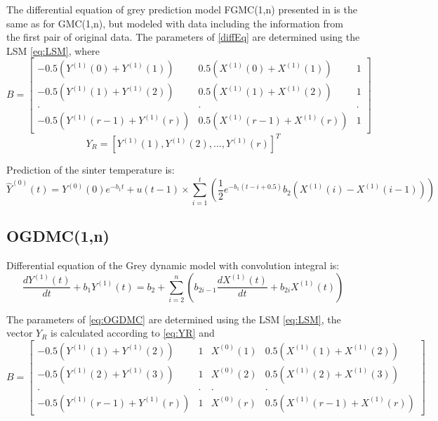\documentclass[AMS,STIX2COL]{WileyNJD-v2}
\begin{document}
The differential equation of grey prediction model FGMC(1,n) presented in \cite{Tien2011} is the same as for GMC(1,n), but modeled with data including the information from the first pair of original data. The parameters of \eqref{diffEq} are determined using the LSM \eqref{eq:LSM}, where 
\begin{equation}
B = \begin{bmatrix}
-0.5\left(Y^{(1)}(0)+Y^{(1)}(1)\right) & 0.5\left(X^{(1)}(0)+X^{(1)}(1)\right) & 1 \\ 
-0.5\left(Y^{(1)}(1)+Y^{(1)}(2)\right) & 0.5\left(X^{(1)}(1)+X^{(1)}(2)\right) & 1 \\
. & . & .\\
-0.5\left(Y^{(1)}(r-1)+Y^{(1)}(r)\right) & 0.5\left(X^{(1)}(r-1)+X^{(1)}(r)\right) & 1
\end{bmatrix}
\end{equation}
\begin{equation} \label{eq:YR}
Y_R = [Y^{(1)}(1),Y^{(1)}(2),...,Y^{(1)}(r)]^T
\end{equation}

Prediction of the sinter temperature is:
\begin{equation}
\hat{Y}^{(0)}(t)=Y^{(0)}(0)e^{-b_1t}+u(t-1) \times\sum_{i=1}^{t}\left(\frac{1}{2}e^{-b_1(t-i+0.5)}b_2\left(X^{(1)}(i)-X^{(1)}(i-1)\right)\right)
\end{equation}

\subsection{OGDMC(1,n)}

Differential equation of the Grey dynamic model with convolution integral is:
\begin{equation} \label{eq:OGDMC}
\frac{dY^{(1)}(t)}{dt}+b_1Y^{(1)}(t)
=b_2+\sum_{i=2}^{n}\left(b_{2i-1}\frac{dX^{(1)}(t)}{dt}+b_{2i}X^{(1)}(t)\right)
\end{equation}

The parameters of \eqref{eq:OGDMC} are determined using the LSM \eqref{eq:LSM}, the vector $Y_R$ is calculated according to \eqref{eq:YR} and
\begin{equation}
B = \begin{bmatrix}
-0.5\left(Y^{(1)}(1)+Y^{(1)}(2)\right) &1&X^{(0)}(1)& 0.5\left(X^{(1)}(1)+X^{(1)}(2)\right)   \\ 
-0.5\left(Y^{(1)}(2)+Y^{(1)}(3)\right) &1&X^{(0)}(2)&  0.5\left(X^{(1)}(2)+X^{(1)}(3)\right) \\
. & . & . & .\\
-0.5\left(Y^{(1)}(r-1)+Y^{(1)}(r)\right)&1&X^{(0)}(r)&  0.5\left(X^{(1)}(r-1)+X^{(1)}(r)\right) 
\end{bmatrix}
\end{equation}
\end{document}
